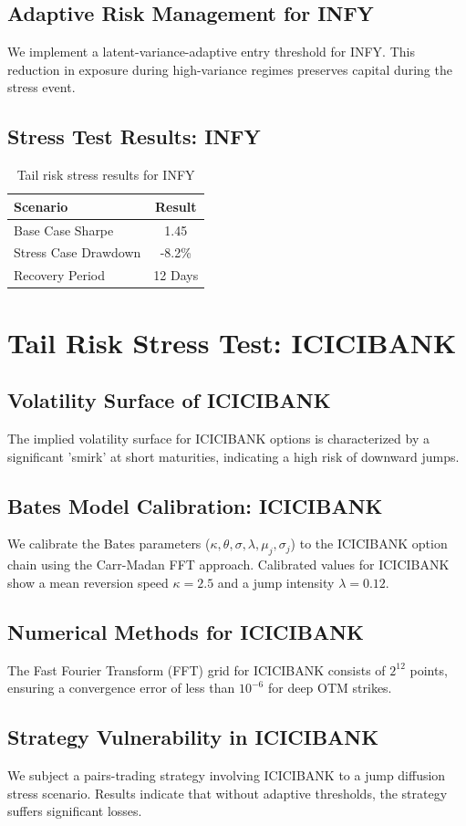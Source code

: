 \documentclass[12pt,a4paper,twoside]{article}
\begin{document}
\subsection{Adaptive Risk Management for INFY}
We implement a latent-variance-adaptive entry threshold for INFY. This reduction in exposure during high-variance regimes preserves capital during the stress event.
\subsection{Stress Test Results: INFY}
\begin{table}[H]
\centering
\begin{tabular}{|l|c|}
\hline
Scenario & Result \\
\hline
Base Case Sharpe & 1.45 \\
Stress Case Drawdown & -8.2\% \\
Recovery Period & 12 Days \\
\hline
\end{tabular}
\caption{Tail risk stress results for INFY}
\end{table}
\newpage

\section{Tail Risk Stress Test: ICICIBANK}
\subsection{Volatility Surface of ICICIBANK}
The implied volatility surface for ICICIBANK options is characterized by a significant 'smirk' at short maturities, indicating a high risk of downward jumps.
\subsection{Bates Model Calibration: ICICIBANK}
We calibrate the Bates parameters ($\kappa, \theta, \sigma, \lambda, \mu_j, \sigma_j$) to the ICICIBANK option chain using the Carr-Madan FFT approach.
Calibrated values for ICICIBANK show a mean reversion speed $\kappa = 2.5$ and a jump intensity $\lambda = 0.12$.
\subsection{Numerical Methods for ICICIBANK}
The Fast Fourier Transform (FFT) grid for ICICIBANK consists of $2^{12}$ points, ensuring a convergence error of less than $10^{-6}$ for deep OTM strikes.
\subsection{Strategy Vulnerability in ICICIBANK}
We subject a pairs-trading strategy involving ICICIBANK to a jump diffusion stress scenario. Results indicate that without adaptive thresholds, the strategy suffers significant losses.
\end{document}
